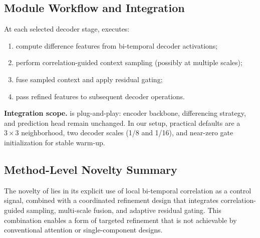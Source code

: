 \subsection{Module Workflow and Integration}
At each selected decoder stage, \cosa{} executes:
\begin{enumerate}
  \item compute difference features from bi-temporal decoder activations;
  \item perform correlation-guided context sampling (possibly at multiple scales);
  \item fuse sampled context and apply residual gating;
  \item pass refined features to subsequent decoder operations.
\end{enumerate}

\noindent\textbf{Integration scope.} \cosa{} is plug-and-play: encoder backbone, differencing strategy, and prediction head remain unchanged. In our setup, practical defaults are a $3\times3$ neighborhood, two decoder scales (1/8 and 1/16), and near-zero gate initialization for stable warm-up.

\subsection{Method-Level Novelty Summary}
The novelty of \cosa{} lies in its explicit use of local bi-temporal correlation as a control signal, combined with a coordinated refinement design that integrates correlation-guided sampling, multi-scale fusion, and adaptive residual gating. This combination enables a form of targeted refinement that is not achievable by conventional attention or single-component designs.
